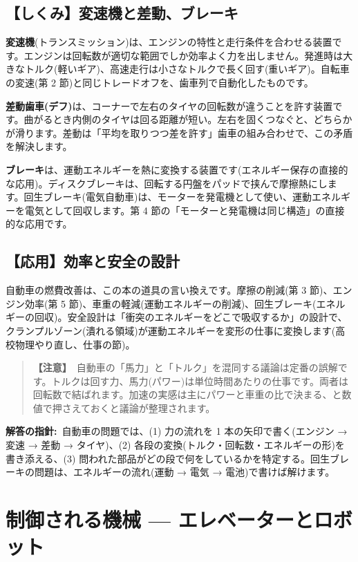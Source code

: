\documentclass{article}
\begin{document}
\subsection{【しくみ】変速機と差動、ブレーキ}

\textbf{変速機}(トランスミッション)は、エンジンの特性と走行条件を合わせる装置です。エンジンは回転数が適切な範囲でしか効率よく力を出しません。発進時は大きなトルク(軽いギア)、高速走行は小さなトルクで長く回す(重いギア)。自転車の変速(第 2 節)と同じトレードオフを、歯車列で自動化したものです。

\textbf{差動歯車(デフ)}は、コーナーで左右のタイヤの回転数が違うことを許す装置です。曲がるとき内側のタイヤは回る距離が短い。左右を固くつなぐと、どちらかが滑ります。差動は「平均を取りつつ差を許す」歯車の組み合わせで、この矛盾を解決します。

\textbf{ブレーキ}は、運動エネルギーを熱に変換する装置です(エネルギー保存の直接的な応用)。ディスクブレーキは、回転する円盤をパッドで挟んで摩擦熱にします。回生ブレーキ(電気自動車)は、モーターを発電機として使い、運動エネルギーを電気として回収します。第 4 節の「モーターと発電機は同じ構造」の直接的な応用です。

\subsection{【応用】効率と安全の設計}

自動車の燃費改善は、この本の道具の言い換えです。摩擦の削減(第 3 節)、エンジン効率(第 5 節)、車重の軽減(運動エネルギーの削減)、回生ブレーキ(エネルギーの回収)。安全設計は「衝突のエネルギーをどこで吸収するか」の設計で、クランプルゾーン(潰れる領域)が運動エネルギーを変形の仕事に変換します(高校物理やり直し、仕事の節)。

\begin{quote}
\textbf{【注意】}\ 自動車の「馬力」と「トルク」を混同する議論は定番の誤解です。トルクは回す力、馬力(パワー)は単位時間あたりの仕事です。両者は回転数で結ばれます。加速の実感は主にパワーと車重の比で決まる、と数値で押さえておくと議論が整理されます。
\end{quote}

\textbf{解答の指針:}\ 自動車の問題では、(1) 力の流れを 1 本の矢印で書く(エンジン → 変速 → 差動 → タイヤ)、(2) 各段の変換(トルク・回転数・エネルギーの形)を書き添える、(3) 問われた部品がどの段で何をしているかを特定する。回生ブレーキの問題は、エネルギーの流れ(運動 → 電気 → 電池)で書けば解けます。

\section{制御される機械 — エレベーターとロボット}
\end{document}
